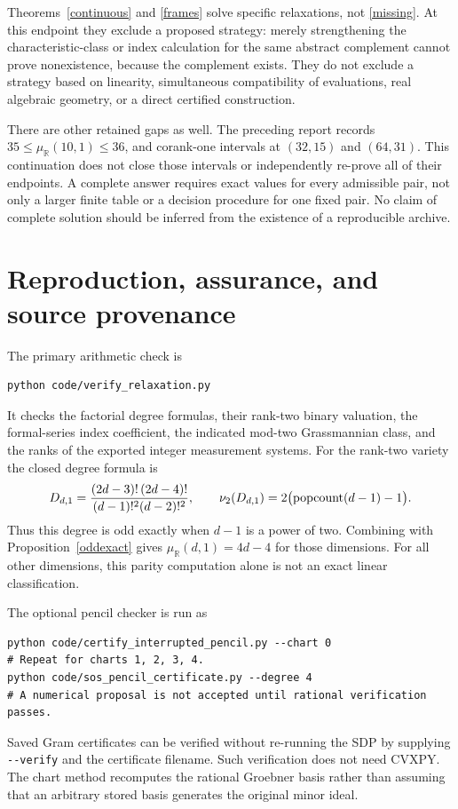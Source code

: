 \documentclass[11pt]{article}
\theoremstyle{remark}\newtheorem{remark}[theorem]{Remark}
\newcommand{\R}{\mathbb R}\newcommand{\C}{\mathbb C}\newcommand{\Q}{\mathbb Q}
\begin{document}
Theorems~\ref{continuous} and \ref{frames} solve specific relaxations, not
\eqref{missing}. At this endpoint they exclude a proposed strategy: merely
strengthening the characteristic-class or index calculation for the same
abstract complement cannot prove nonexistence, because the complement exists.
They do not exclude a strategy based on linearity, simultaneous compatibility
of evaluations, real algebraic geometry, or a direct certified construction.

There are other retained gaps as well. The preceding report records
$35\le\mu_\R(10,1)\le36$, and corank-one intervals at $(32,15)$ and $(64,31)$.
This continuation does not close those intervals or independently re-prove all
of their endpoints. A complete answer requires exact values for every
admissible pair, not only a larger finite table or a decision procedure for
one fixed pair. No claim of complete solution should be inferred from the
existence of a reproducible archive.

\appendix
\section{Reproduction, assurance, and source provenance}
The primary arithmetic check is
\begin{Verbatim}[fontsize=\small]
python code/verify_relaxation.py
\end{Verbatim}
It checks the factorial degree formulas, their rank-two binary valuation,
the formal-series index coefficient, the indicated mod-two Grassmannian
class, and the ranks of the exported integer measurement systems. For the
rank-two variety the closed degree formula is
\[
 D_{d,1}=\frac{(2d-3)!\,(2d-4)!}{(d-1)!^2(d-2)!^2},
 \qquad \nu_2(D_{d,1})=2\bigl(\operatorname{popcount}(d-1)-1\bigr).
\]
Thus this degree is odd exactly when $d-1$ is a power of two. Combining with
Proposition~\ref{oddexact} gives $\mu_\R(d,1)=4d-4$ for those dimensions.
For all other dimensions, this parity computation alone is not an exact
linear classification.

The optional pencil checker is run as
\begin{Verbatim}[fontsize=\small]
python code/certify_interrupted_pencil.py --chart 0
# Repeat for charts 1, 2, 3, 4.
python code/sos_pencil_certificate.py --degree 4
# A numerical proposal is not accepted until rational verification passes.
\end{Verbatim}
Saved Gram certificates can be verified without re-running the SDP by supplying
\verb|--verify| and the certificate filename. Such verification does not need
CVXPY. The chart method recomputes the rational Groebner basis rather than
assuming that an arbitrary stored basis generates the original minor ideal.
\end{document}
